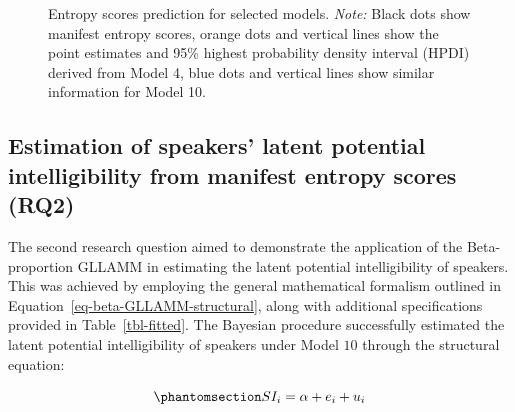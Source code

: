 \documentclass[
]{agujournal2019}
\begin{document}
\label{cell-fig-rq1-pred-speaker}
\begin{figure}[H]


\caption{\label{fig-rq1-pred-speaker}Entropy scores prediction for
selected models. \emph{Note:} Black dots show manifest entropy scores,
orange dots and vertical lines show the point estimates and 95\% highest
probability density interval (HPDI) derived from Model 4, blue dots and
vertical lines show similar information for Model 10.}

\end{figure}%

\subsection{Estimation of speakers' latent potential intelligibility
from manifest entropy scores (RQ2)}\label{sec-R-RQ2}

The second research question aimed to demonstrate the application of the
Beta-proportion GLLAMM in estimating the latent potential
intelligibility of speakers. This was achieved by employing the general
mathematical formalism outlined in
Equation~\ref{eq-beta-GLLAMM-structural}, along with additional
specifications provided in Table~\ref{tbl-fitted}. The Bayesian
procedure successfully estimated the latent potential intelligibility of
speakers under Model \(10\) through the structural equation:

\begin{equation}\phantomsection\label{eq-beta-GLLAMM-structural-model10}{
SI_{i} = \alpha + e_{i} + u_{i}
}\end{equation}
\end{document}
